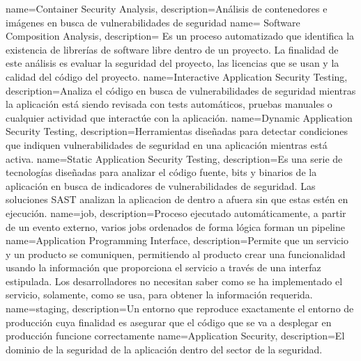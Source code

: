{
        name=Container Security Analysis,
        description={Análisis de contenedores e imágenes en busca de
        vulnerabilidades de seguridad}
}
{
        name= Software Composition Analysis,
        description= {Es un proceso automatizado que identifica la existencia de
        librerías de software libre dentro de un proyecto. La finalidad de este
        análisis es evaluar la seguridad del proyecto, las licencias que se usan
        y la calidad del código del proyecto.}
}
{
        name=Interactive Application Security Testing,
        description={Analiza el código en busca de vulnerabilidades de seguridad
        mientras la aplicación está siendo revisada con tests automáticos,
        pruebas manuales o cualquier actividad que interactúe con la aplicación.}
}
{
        name=Dynamic Application Security Testing,
        description={Herramientas diseñadas para detectar condiciones que
        indiquen vulnerabilidades de seguridad en una aplicación mientras está
        activa.}
}
{
        name=Static Application Security Testing,
        description={Es una serie de tecnologías diseñadas para analizar el
        código fuente, bits y binarios de la aplicación en busca de indicadores
        de vulnerabilidades de seguridad. Las soluciones SAST analizan la
        aplicacion de dentro a afuera sin que estas estén en ejecución.  }
}
{
        name=job,
        description={Proceso ejecutado automáticamente, a partir de un evento
        externo, varios jobs ordenados de forma lógica forman un pipeline}
}
{
        name=Application Programming Interface, description={Permite que un
        servicio y un producto se comuniquen, permitiendo al producto crear una
        funcionalidad usando la información que proporciona el servicio a través
        de una interfaz estipulada.  Los desarrolladores no necesitan saber como
        se ha implementado el servicio, solamente, como se usa, para obtener la
        información requerida.}
}
{
        name=staging,
        description={Un entorno que reproduce exactamente el entorno de
        producción cuya finalidad es asegurar que el código que se va a
        desplegar en producción funcione correctamente}
}
{
        name=Application Security,
        description={El dominio de la seguridad de la aplicación dentro del 
        sector de la seguridad.}
}
